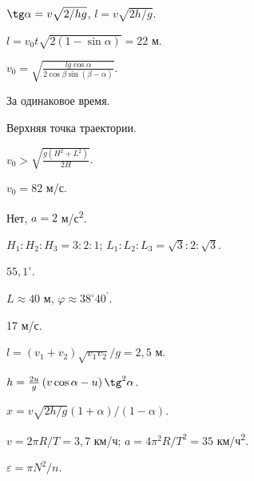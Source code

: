\begin{Answer}{22}
$\tg \alpha = v \sqrt{2/hg}$, $l = v \sqrt{2h/g}$.
\end{Answer}
\begin{Answer}{23}
$l = v_0 t \sqrt{2(1-\sin \alpha)} = 22$ м.
\end{Answer}
\begin{Answer}{24}
$v_0 = \sqrt{\frac{lg \cos \alpha}{2 \cos \beta \sin \left( \beta - \alpha \right)}}$.
\end{Answer}
\begin{Answer}{25}
За одинаковое время.
\end{Answer}
\begin{Answer}{26}
Верхняя точка траектории.
\end{Answer}
\begin{Answer}{27}
$v_0 > \sqrt{\frac{g(H^2+L^2)}{2H}}$.
\end{Answer}
\begin{Answer}{28}
$v_0 = 82$ м/с.
\end{Answer}
\begin{Answer}{29}
Нет, $a = 2$ м/с\textsuperscript{2}.
\end{Answer}
\begin{Answer}{30}
$H_1 : H_2 : H_3 = 3 : 2 : 1$; $L_1 : L_2 : L_3 = \sqrt{3} : 2 : \sqrt{3}$.
\end{Answer}
\begin{Answer}{31}
$55,1^{ \circ }$.
\end{Answer}
\begin{Answer}{32}
$L \approx 40$ м, $\varphi \approx 38^{\circ}40^\prime$.
\end{Answer}
\begin{Answer}{33}
17 м/с.
\end{Answer}
\begin{Answer}{34}
$l = (v_1 + v_2)\sqrt{v_1 v_2}/g = 2,5$ м.
\end{Answer}
\begin{Answer}{35}
$h = \frac{2u}{g}\left( v \cos \alpha - u \right) \tg^2 \alpha$.
\end{Answer}
\begin{Answer}{36}
$x = v \sqrt{2h/g} \left( 1 + \alpha \right) / \left( 1 - \alpha \right)$.
\end{Answer}
\begin{Answer}{37}
$v = 2 \pi R/T = 3,7$ км/ч; $a = 4\pi^2 R/T^2 = 35$ км/ч\textsuperscript{2}.
\end{Answer}
\begin{Answer}{38}
$\varepsilon = \pi N^2/n$.
\end{Answer}
